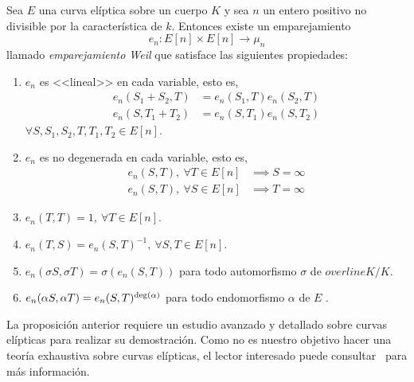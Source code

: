 \begin{proposicion}\label{pp:endomorfismo Weil}
	Sea $E$ una curva elíptica sobre un cuerpo $K$ y sea $n$ un entero positivo no divisible por la característica de $k$. Entonces existe un emparejamiento
	$$
		e_n : E[n] \times E[n] \to \mu_n
	$$
	llamado \emph{emparejamiento Weil} que satisface las siguientes propiedades:
	\begin{enumerate}
		\item $e_n$ es <<lineal>> en cada variable, esto es,
			\begin{align*}
				e_n(S_1 + S_2, T) &= e_n(S_1, T) e_n(S_2, T) \\
				e_n(S, T_1 + T_2) &= e_n(S, T_1) e_n(S, T_2)
			\end{align*}
		$\forall S, S_1, S_2, T, T_1, T_2 \in E[n]$.

		\item $e_n$ es no degenerada en cada variable, esto es,
			\begin{align*}
				e_n(S, T), \ \forall T \in E[n] &\implies S = \infty \\
				e_n(S, T), \ \forall S \in E[n] &\implies T = \infty
			\end{align*}

		\item $e_n(T, T) = 1, \ \forall T \in E[n]$.

		\item $e_n(T, S) = e_n(S, T)^{-1}, \ \forall S, T \in E[n]$.

		\item $e_n(\sigma S, \sigma T) = \sigma(e_n(S, T))$ para todo automorfismo $\sigma$ de $overline{K}/K$. %

		\item $e_n(\alpha S, \alpha T) = e_n(S, T)^{\deg(\alpha)}$ para todo endomorfismo $\alpha$ de $E$ .
	\end{enumerate}
\end{proposicion}

La proposición anterior requiere un estudio avanzado y detallado sobre curvas elípticas para realizar su demostración. Como no es nuestro objetivo hacer una teoría exhaustiva sobre curvas elípticas, el lector interesado puede consultar~\cite[cap. 11]{Washington:2008} para más información.


